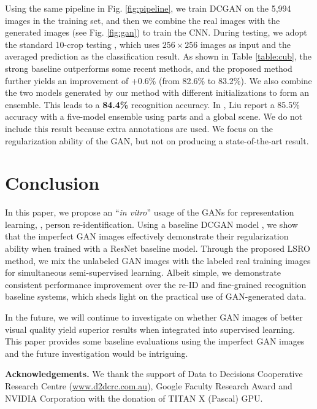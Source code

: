 \documentclass[10pt,twocolumn,letterpaper]{article}
\begin{document}
Using the same pipeline in Fig. \ref{fig:pipeline}, we train DCGAN on the 5,994 images in the training set, and then we combine the real images with the generated images (see Fig. \ref{fig:gan}) to train the CNN. During testing, we adopt the standard 10-crop testing \cite{krizhevsky2012imagenet}, which uses $256\times256$ images as input and the averaged prediction as the classification result. As shown in Table \ref{table:cub}, the strong baseline outperforms some recent methods, and the proposed method further yields an improvement of +0.6\% (from 82.6\% to 83.2\%).
We also combine the two models generated by our method with different initializations to form an ensemble. This leads to a \textbf{84.4\%} recognition accuracy. In \cite{liu2016localizing}, Liu \etal report a 85.5\% accuracy with a five-model ensemble using parts and a global scene. We do not include this result because extra annotations are used. We focus on the regularization ability of the GAN, but not on producing a state-of-the-art result.

\section{Conclusion}
In this paper, we propose an ``\emph{in vitro}'' usage of the GANs for representation learning, \ie, person re-identification. Using a baseline DCGAN model \cite{radford2015unsupervised}, we show that the imperfect GAN images effectively demonstrate their regularization ability when trained with a ResNet baseline model. Through the proposed LSRO method, we mix the unlabeled GAN images with the labeled real training images for simultaneous semi-supervised learning. Albeit simple, we demonstrate consistent performance improvement over the re-ID and fine-grained recognition baseline systems, which sheds light on the practical use of GAN-generated data. 

In the future, we will continue to investigate on whether GAN images of better visual quality yield superior results when integrated into supervised learning. This paper provides some baseline evaluations using the imperfect GAN images and the future investigation would be intriguing. 

\textbf{Acknowledgements.} We thank the support of Data to Decisions Cooperative Research Centre (\url{www.d2dcrc.com.au}), Google Faculty Research Award and NVIDIA Corporation with the donation of TITAN X (Pascal) GPU.

{
\footnotesize


}
\end{document}
